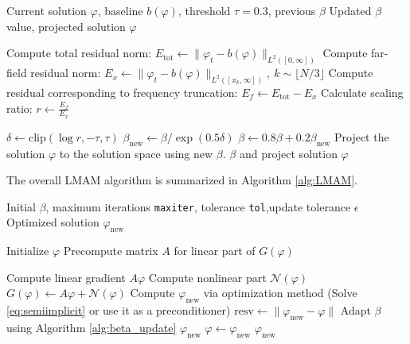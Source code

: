 \documentclass[a4paper,fleqn, 12pt]{cas-sc}
\numberwithin{table}{section}
\begin{document}
\begin{algorithm}[htbp]
\caption{Adaptive $\beta$ Update} \label{alg:beta_update}
\begin{algorithmic}[1]
\Require Current solution $\varphi$, baseline $b(\varphi)$, threshold $\tau=0.3$, previous $\beta$
\Ensure Updated $\beta$ value, projected solution $\varphi$

\State Compute total residual norm: $E_\text{tot} \gets \|\varphi_t - b(\varphi)\|_{L^2( [0,\infty])}$ 
\State Compute far-field residual norm: $E_x \gets \|\varphi_t - b(\varphi)\|_{L^2( [x_k,\infty])}, \ k\sim\lfloor N/3 \rfloor$
\State Compute residual corresponding to frequency truncation:  $E_f \gets E_\text{tot} - E_x$
\State Calculate scaling ratio: $r \gets \frac{E_f}{E_x}$ 
 
 
    \State $\delta \gets \text{clip}(\log r, -\tau, \tau)$
    \State $\beta_{\text{new}} \gets \beta / \exp(0.5\delta)$
    \State $\beta \gets 0.8\beta + 0.2\beta_{\text{new}}$ 
\EndIf
\State Project the solution $\varphi$ to the solution space using new $\beta$.
\State \Return $\beta$ and project solution $\varphi$
\end{algorithmic}
\end{algorithm}

The overall LMAM algorithm is summarized in Algorithm \ref{alg:LMAM}.

\begin{algorithm}[htbp]
\caption{LMAM} \label{alg:LMAM}
\begin{algorithmic}[1]
\Require Initial $\beta$, maximum iterations \texttt{maxiter}, tolerance \texttt{tol},update tolerance $\epsilon$
\Ensure Optimized solution $\varphi_{\text{new}}$

\State Initialize $\varphi$
\State Precompute matrix $A$ for linear part of $G(\varphi)$ 
    
    \State Compute linear gradient $A\varphi$
    \State Compute nonlinear part $\mathcal{N}(\varphi)$ 
    \State $G(\varphi) \gets A\varphi +\mathcal{N}(\varphi)$ 
    \State Compute $\varphi_{\text{new}}$ via optimization method (Solve \eqref{eq:semiimplicit} or use it as a preconditioner)
    \State $\text{resv} \gets \|\varphi_{\text{new}} - \varphi\|$ 
		\State  Adapt $\beta$ using Algorithm \ref{alg:beta_update} 
	\EndIf
        \State \Return $\varphi_{\text{new}}$
    \Else
        \State $\varphi \gets \varphi_{\text{new}}$ 
    \EndIf
\EndFor
\State \Return $\varphi_{\text{new}}$ 
\end{algorithmic}
\end{algorithm}
\end{document}
